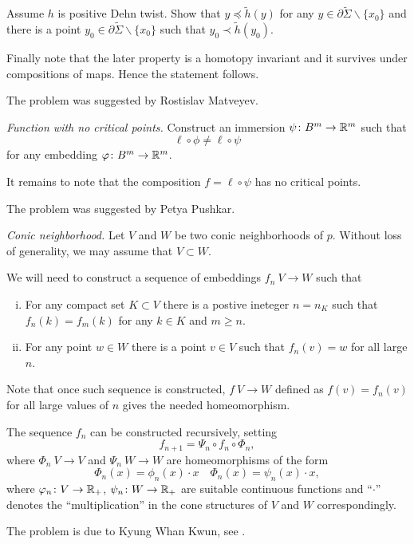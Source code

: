 Assume $h$ is positive Dehn twist.
Show that 
$y\preceq \tilde h(y)$ for any  $y\in\partial\tilde\Sigma\backslash\{x_0\}$
and there is a point $y_0\in\partial\tilde\Sigma\backslash\{x_0\}$
such that $y_0\prec \tilde h(y_0)$.

Finally note that the later property is a homotopy invariant 
and it survives under compositions of maps.
Hence the statement follows.

 The problem was suggested by Rostislav Matveyev.

\textit{Function with no critical points.}
Construct an immersion $\psi\:B^m\z\to\RR^m$ such that 
\[\ell\circ\phi\ne\ell\circ\psi\]
for any embedding  $\varphi\colon B^m\to\mathbb{R}^m$.

It remains to note that the composition $f=\ell\circ\psi$ has no critical points.

The problem was suggested by Petya Pushkar.

\textit{Conic neighborhood.}
Let $V$ and $W$ be two conic neighborhoods of $p$.
Without loss of generality, we may assume that $V\subset W$.

We will need to construct a sequence of embeddings $f_n\:V\to W$
such that 
\begin{enumerate}[(i)]
\item 
For any compact set $K\subset V$ 
there is a postive ineteger $n=n_K$ such that 
$f_n(k)=f_m(k)$ for any $k\in K$ and $m\ge n$.
\item For any point $w\in W$ there is a point $v\in V$ such that $f_n(v)=w$ for all large $n$.
\end{enumerate}

Note that once such sequence is constructed, $f\:V\to W$ defined as $f(v)=f_n(v)$ for all large values of $n$ gives the needed homeomorphism.

The sequence $f_n$ can be constructed recursively, setting
\[f_{n+1}=\Psi_n\circ f_n\circ \Phi_n,\]
where $\Phi_n\:V\to V$ 
and $\Psi_n\:W\to W$ 
are homeomorphisms
of the form 
\[\Phi_n(x)=\phi_n(x)\cdot x\quad \Phi_n(x)=\psi_n(x)\cdot x,\]
where $\varphi_n\colon V\to \mathbb{R}_+$, $\psi_n\colon W\to \mathbb{R}_+$ are suitable continuous functions 
and 
``$\cdot$'' denotes the ``multiplication'' in the cone structures of $V$ and $W$ correspondingly.

The problem is due to Kyung Whan Kwun, see \cite{kwun}.


